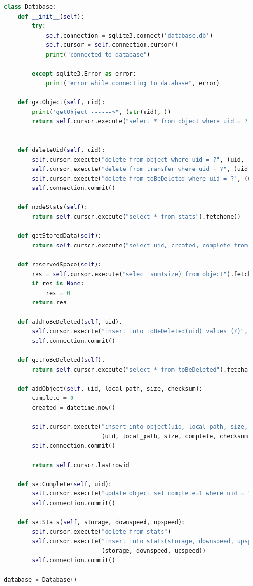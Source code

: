 \documentclass{article}
\begin{document}
\begin{lstlisting}[language=Python, title=Codice]
class Database:
    def __init__(self):
        try:
            self.connection = sqlite3.connect('database.db')
            self.cursor = self.connection.cursor()
            print("connected to database")

        except sqlite3.Error as error:
            print("error while connecting to database", error)

    def getObject(self, uid):
        print("getObject ------>", (str(uid), ))
        return self.cursor.execute("select * from object where uid = ?", (str(uid), )).fetchone()


    def deleteUid(self, uid):
        self.cursor.execute("delete from object where uid = ?", (uid, ))
        self.cursor.execute("delete from transfer where uid = ?", (uid, ))
        self.cursor.execute("delete from toBeDeleted where uid = ?", (uid, ))
        self.connection.commit()

    def nodeStats(self):
        return self.cursor.execute("select * from stats").fetchone()

    def getStoredData(self):
        return self.cursor.execute("select uid, created, complete from object").fetchall()

    def reservedSpace(self):
        res = self.cursor.execute("select sum(size) from object").fetchone()[0]
        if res is None:
            res = 0
        return res

    def addToBeDeleted(self, uid):
        self.cursor.execute("insert into toBeDeleted(uid) values (?)", (uid, ))
        self.connection.commit()

    def getToBeDeleted(self):
        return self.cursor.execute("select * from toBeDeleted").fetchall()

    def addObject(self, uid, local_path, size, checksum):
        complete = 0
        created = datetime.now()

        self.cursor.execute("insert into object(uid, local_path, size, complete, checksum, created) values (?, ?, ?, ?, ?, ?)",
                            (uid, local_path, size, complete, checksum, created))
        self.connection.commit()

        return self.cursor.lastrowid

    def setComplete(self, uid):
        self.cursor.execute("update object set complete=1 where uid = ?", (uid, ))
        self.connection.commit()

    def setStats(self, storage, downspeed, upspeed):
        self.cursor.execute("delete from stats")
        self.cursor.execute("insert into stats(storage, downspeed, upspeed) values (?, ?, ?)",
                            (storage, downspeed, upspeed))
        self.connection.commit()

database = Database()
\end{lstlisting}
\end{document}
